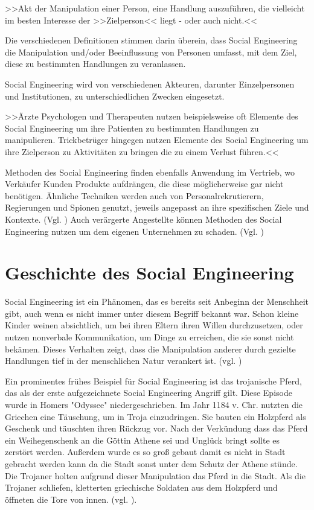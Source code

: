 >>Akt der Manipulation einer Person, eine Handlung auszuführen, die vielleicht im besten Interesse der >>Zielperson<< liegt - oder auch nicht.<<\cite{Hadn1}


Die verschiedenen Definitionen stimmen darin überein, dass Social Engineering die Manipulation und/oder Beeinflussung von Personen umfasst, mit dem Ziel, diese zu bestimmten Handlungen zu veranlassen.

Social Engineering wird von verschiedenen Akteuren, darunter Einzelpersonen und Institutionen, zu unterschiedlichen Zwecken eingesetzt.

>>Ärzte Psychologen und Therapeuten nutzen beispielsweise oft Elemente des Social Engineering um ihre Patienten zu bestimmten Handlungen zu manipulieren. Trickbetrüger hingegen nutzen Elemente des Social Engineering um ihre Zielperson zu Aktivitäten zu bringen die zu einem Verlust führen.<< \cite{Hadn1}

Methoden des Social Engineering finden ebenfalls Anwendung im Vertrieb, wo Verkäufer Kunden Produkte aufdrängen, die diese möglicherweise gar nicht benötigen. Ähnliche Techniken werden auch von Personalrekrutierern, Regierungen und Spionen genutzt, jeweils angepasst an ihre spezifischen Ziele und Kontexte. (Vgl. \cite{werSE})
Auch verärgerte Angestellte können Methoden des Social Engineering nutzen um dem eigenen Unternehmen zu schaden. (Vgl. \cite{Hadn2})

\section{Geschichte des Social Engineering}

Social Engineering ist ein Phänomen, das es bereits seit Anbeginn der Menschheit gibt, auch wenn es nicht immer unter diesem Begriff bekannt war. Schon kleine Kinder weinen absichtlich, um bei ihren Eltern ihren Willen durchzusetzen, oder nutzen nonverbale Kommunikation, um Dinge zu erreichen, die sie sonst nicht bekämen. Dieses Verhalten zeigt, dass die Manipulation anderer durch gezielte Handlungen tief in der menschlichen Natur verankert ist. (vgl. \cite{SEinNaturdesMenschverankert})

Ein prominentes frühes Beispiel für Social Engineering ist das trojanische Pferd, das als der erste aufgezeichnete Social Engineering Angriff gilt. Diese Episode wurde in Homers "Odyssee" niedergeschrieben. Im Jahr 1184 v. Chr. nutzten die Griechen eine Täuschung, um in Troja einzudringen. Sie bauten ein Holzpferd als Geschenk und täuschten ihren Rückzug vor. Nach der Verkündung dass das Pferd ein Weihegenschenk an die Göttin Athene sei und Unglück bringt sollte es zerstört werden. Außerdem wurde es so groß gebaut damit es nicht in Stadt gebracht werden kann da die Stadt sonst unter dem Schutz der Athene stünde. Die Trojaner holten aufgrund dieser Manipulation das Pferd in die Stadt. Als die Trojaner schliefen, kletterten griechische Soldaten aus dem Holzpferd und öffneten die Tore von innen. (vgl. \cite{troja}).

